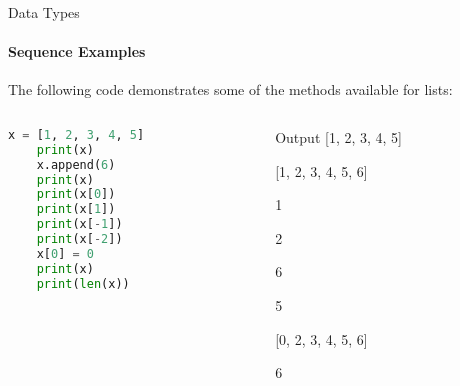 \documentclass[
    aspectratio=169, 
    usepdftitle=false, 
    xcolor={dvipsnames},
    hyperref={
        colorlinks,
        linkcolor=black,
        urlcolor=blue}
    ]{beamer}
\begin{document}
\begin{frame}[fragile]{Data Types}
    \framesubtitle{Sequence Examples}
    The following code demonstrates some of the methods available for lists:
    \begin{columns}
        \begin{column}{0.5\textwidth}
            \begin{lstlisting}[language=Python]
    x = [1, 2, 3, 4, 5]
    print(x)
    x.append(6)
    print(x)
    print(x[0])
    print(x[1])
    print(x[-1])
    print(x[-2])
    x[0] = 0
    print(x)
    print(len(x))
    \end{lstlisting}
        \end{column}
        \begin{column}{0.4\textwidth}
            \begin{block}{Output}
                [1, 2, 3, 4, 5]

                [1, 2, 3, 4, 5, 6]

                1

                2

                6

                5

                [0, 2, 3, 4, 5, 6]

                6
            \end{block}
        \end{column}
    \end{columns}
\end{frame}
\end{document}
